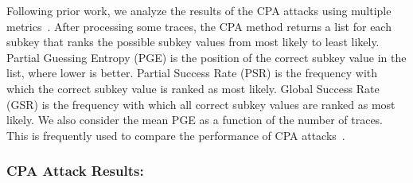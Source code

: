 

Following prior work, we analyze the results of the CPA attacks using multiple metrics~\cite{clavier14_practical}. After processing some traces, the CPA method returns a list for each subkey that ranks the possible subkey values from most likely to least likely. Partial Guessing Entropy (PGE) is the position of the correct subkey value in the list, where lower is better. Partial Success Rate (PSR) is the frequency with which the correct subkey value is ranked as most likely. Global Success Rate (GSR) is the frequency with which all correct subkey values are ranked as most likely. We also consider the mean PGE as a function of the number of traces. This is frequently used to compare the performance of CPA attacks~\cite{oflynn15_side,oflynn16_power,oflynn19_device}.

\subsubsection*{\textbf{CPA Attack Results:}}

